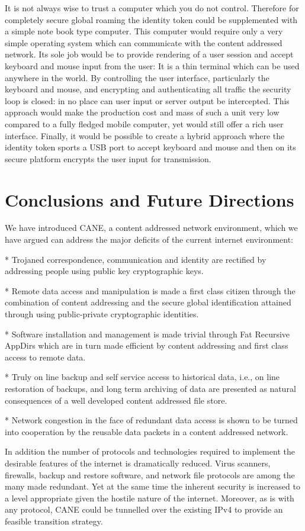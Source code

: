 \documentclass[british,english]{article}
\newenvironment{lyxlist}[1]
{\begin{list}{}
{\settowidth{\labelwidth}{#1}
 \setlength{\leftmargin}{\labelwidth}
 \addtolength{\leftmargin}{\labelsep}
 \renewcommand{\makelabel}[1]{##1\hfil}}}
{\end{list}}
\begin{document}
It is not always wise to trust a computer which you do not control.
Therefore for completely secure global roaming the identity token
could be supplemented with a simple note book type computer. This
computer would require only a very simple operating system which can
communicate with the content addressed network. Its sole job would
be to provide rendering of a user session and accept keyboard and
mouse input from the user: It is a thin terminal which can be used
anywhere in the world. By controlling the user interface, particularly
the keyboard and mouse, and encrypting and authenticating all traffic
the security loop is closed: in no place can user input or server
output be intercepted. This approach would make the production cost
and mass of such a unit very low compared to a fully fledged mobile
computer, yet would still offer a rich user interface. Finally, it
would be possible to create a hybrid approach where the identity token
sports a USB port to accept keyboard and mouse and then on its secure
platform encrypts the user input for transmission.


\section{Conclusions and Future Directions}

We have introduced CANE, a content addressed network environment,
which we have argued can address the major deficits of the current
internet environment:

\begin{lyxlist}{00.00.0000}
\item [{{*}}] Trojaned correspondence, communication and identity are rectified
by addressing people using public key cryptographic keys.
\item [{{*}}] Remote data access and manipulation is made a first class
citizen through the combination of content addressing and the secure
global identification attained through using public-private cryptographic
identities.
\item [{{*}}] Software installation and management is made trivial through
Fat Recursive AppDirs which are in turn made efficient by content
addressing and first class access to remote data.
\item [{{*}}] Truly on line backup and self service access to historical
data, i.e., on line restoration of backups, and long term archiving
of data are presented as natural consequences of a well developed
content addressed file store.
\item [{{*}}] Network congestion in the face of redundant data access is
shown to be turned into cooperation by the reusable data packets in
a content addressed network.
\end{lyxlist}
In addition the number of protocols and technologies required to implement
the desirable features of the internet is dramatically reduced. Virus
scanners, firewalls, backup and restore software, and network file
protocols are among the many made redundant. Yet at the same time
the inherent security is increased to a level appropriate given the
hostile nature of the internet. Moreover, as is with any protocol,
CANE could be tunnelled over the existing IPv4 to provide an feasible
transition strategy.
\end{document}
